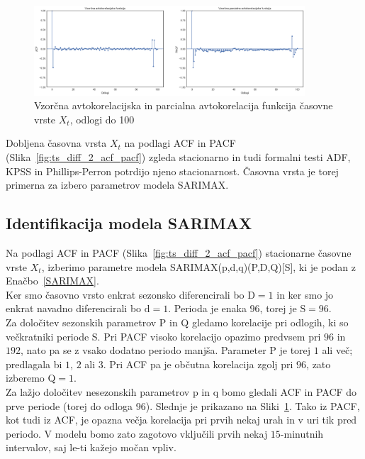 \documentclass[a4paper, 11pt]{article}
\begin{document}
\begin{figure}[h!]
    \caption{Vzorčna avtokorelacijska in parcialna avtokorelacija funkcija časovne vrste $X_t$, odlogi do 100}\par\medskip
    \centering
    \label{fig:ts_diff_2_acf_pacf_do_100}
    \includegraphics[width=0.9\textwidth]{ts_diff_2_acf_pacf_do_100.png}
\end{figure}

\noindent Dobljena časovna vrsta $X_t$ na podlagi ACF in PACF (Slika~\ref{fig:ts_diff_2_acf_pacf}) 
zgleda stacionarno in tudi formalni testi ADF, 
KPSS in Phillips-Perron potrdijo njeno stacionarnost. 
Časovna vrsta je torej primerna za izbero parametrov modela SARIMAX. 


\subsection{Identifikacija modela SARIMAX}

\noindent Na podlagi ACF in PACF (Slika~\ref{fig:ts_diff_2_acf_pacf}) stacionarne časovne vrste $X_t$, izberimo parametre 
modela SARIMAX(p,d,q)(P,D,Q)[S], ki je podan z Enačbo~\eqref{SARIMAX}. \\

\noindent Ker smo časovno vrsto enkrat sezonsko diferencirali bo $\text{D} = 1$ in ker smo jo enkrat 
navadno diferencirali bo $\text{d} = 1$. Perioda je enaka $96$, torej je $\text{S} = 96$. \\

\noindent Za določitev sezonskih parametrov P in Q gledamo korelacije pri odlogih, ki so večkratniki periode S. Pri
PACF visoko korelacijo opazimo predvsem pri $96$ in $192$, nato pa se z vsako dodatno periodo manjša. Parameter P je torej 
$1$ ali več; predlagala bi $1$, $2$ ali $3$. 
Pri ACF pa je občutna korelacija zgolj pri $96$, zato izberemo $\text{Q} = 1$. \\

\noindent Za lažjo določitev nesezonskih parametrov p in q bomo gledali ACF in PACF do prve periode (torej do odloga 96). 
Slednje je prikazano na Sliki~\ref{fig:ts_diff_2_acf_pacf_do_100}. Tako iz PACF, kot tudi iz ACF, je opazna večja korelacija
pri prvih nekaj urah in v uri tik pred periodo. V modelu bomo zato zagotovo vključili prvih nekaj $15$-minutnih intervalov, 
saj le-ti kažejo močan vpliv. \\
\end{document}

